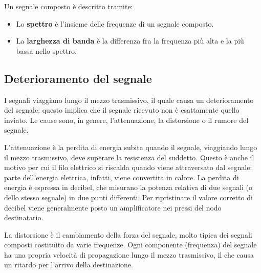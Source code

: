         \vspace{3mm}
        
        Un segnale composto è descritto tramite:
        
        \begin{itemize}
            \item
                Lo \textbf{spettro} è l'insieme delle frequenze di un segnale composto.
            
            \item
                La \textbf{larghezza di banda} è la differenza fra la frequenza più alta e la più bassa nello spettro.
        \end{itemize}
    
    \subsection{Deterioramento del segnale}
    
        I segnali viaggiano lungo il mezzo trasmissivo, il quale causa un deterioramento del segnale: questo implica che il segnale ricevuto non è esattamente quello inviato. Le cause sono, in genere, l'attenuazione, la distorsione o il rumore del segnale.
        
        \vspace{3mm}
        
        L'attenuazione è la perdita di energia subita quando il segnale, viaggiando lungo il mezzo trasmissivo, deve superare la resistenza del suddetto. Questo è anche il motivo per cui il filo elettrico si riscalda quando viene attraversato dal segnale: parte dell'energia elettrica, infatti, viene convertita in calore. La perdita di energia è espressa in decibel, che misurano la potenza relativa di due segnali (o dello stesso segnale) in due punti differenti. Per ripristinare il valore corretto di decibel viene generalmente posto un amplificatore nei pressi del nodo destinatario.
        
        \vspace{3mm}
        
        La distorsione è il cambiamento della forza del segnale, molto tipica dei segnali composti costituito da varie frequenze. Ogni componente (frequenza) del segnale ha una propria velocità di propagazione lungo il mezzo trasmissivo, il che causa un ritardo per l'arrivo della destinazione.
        
        \vspace{3mm}
        
